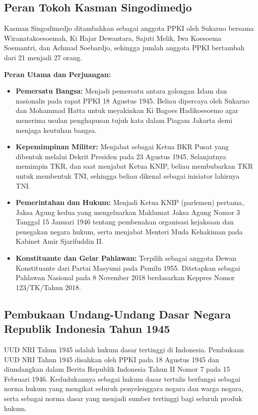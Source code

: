 \subsection{Peran Tokoh Kasman Singodimedjo}

Kasman Singodimedjo ditambahkan sebagai anggota PPKI oleh Sukarno bersama Wiranatakoesoemah, Ki Hajar Dewantara, Sajuti Melik, Iwa Koesoema Soemantri, dan Achmad Soebardjo, sehingga jumlah anggota PPKI bertambah dari 21 menjadi 27 orang.

\textbf{Peran Utama dan Perjuangan:}
\begin{itemize}
\item \textbf{Pemersatu Bangsa:} Menjadi pemersatu antara golongan Islam dan nasionalis pada rapat PPKI 18 Agustus 1945. Beliau dipercaya oleh Sukarno dan Mohammad Hatta untuk meyakinkan Ki Bagoes Hadikoesoemo agar menerima usulan penghapusan tujuh kata dalam Piagam Jakarta demi menjaga keutuhan bangsa.
\item \textbf{Kepemimpinan Militer:} Menjabat sebagai Ketua BKR Pusat yang dibentuk melalui Dekrit Presiden pada 23 Agustus 1945. Selanjutnya memimpin TKR, dan saat menjabat Ketua KNIP, beliau membubarkan TKR untuk membentuk TNI, sehingga beliau dikenal sebagai inisiator lahirnya TNI.
\item \textbf{Pemerintahan dan Hukum:} Menjadi Ketua KNIP (parlemen) pertama, Jaksa Agung kedua yang mengeluarkan Maklumat Jaksa Agung Nomor 3 Tanggal 15 Januari 1946 tentang pembenahan organisasi kejaksaan dan penegakan negara hukum, serta menjabat Menteri Muda Kehakiman pada Kabinet Amir Sjarifuddin II.
\item \textbf{Konstituante dan Gelar Pahlawan:} Terpilih sebagai anggota Dewan Konstituante dari Partai Masyumi pada Pemilu 1955. Ditetapkan sebagai Pahlawan Nasional pada 8 November 2018 berdasarkan Keppres Nomor 123/TK/Tahun 2018.
\end{itemize}

\subsection{Pembukaan Undang-Undang Dasar Negara Republik Indonesia Tahun 1945}

UUD NRI Tahun 1945 adalah hukum dasar tertinggi di Indonesia. Pembukaan UUD NRI Tahun 1945 disahkan oleh PPKI pada 18 Agustus 1945 dan diundangkan dalam Berita Republik Indonesia Tahun II Nomor 7 pada 15 Februari 1946. Kedudukannya sebagai hukum dasar tertulis berfungsi sebagai norma hukum yang mengikat seluruh penyelenggara negara dan warga negara, serta sebagai norma dasar yang menjadi sumber tertinggi bagi seluruh produk hukum.

